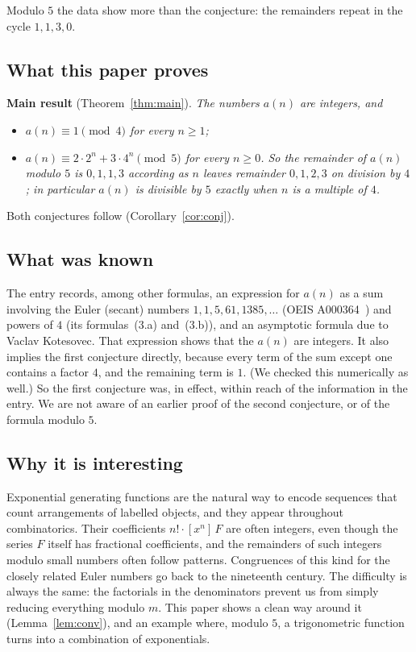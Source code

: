 \documentclass[11pt,a4paper]{article}
\theoremstyle{definition}
\theoremstyle{remark}
\newcommand{\coeff}[2]{[x^{#1}]\,#2}
\begin{document}
Modulo $5$ the data show more than the conjecture: the remainders repeat in the cycle $1,1,3,0$.

\subsection{What this paper proves}
\textbf{Main result} (Theorem~\ref{thm:main}). \emph{The numbers $a(n)$ are integers, and}
\begin{itemize}
\item \emph{$a(n)\equiv1\pmod4$ for every $n\ge1$;}
\item \emph{$a(n)\equiv2\cdot2^n+3\cdot4^n\pmod5$ for every $n\ge0$. So the remainder of $a(n)$ modulo $5$ is $0,1,1,3$
according as $n$ leaves remainder $0,1,2,3$ on division by $4$; in particular $a(n)$ is divisible by $5$ exactly when
$n$ is a multiple of $4$.}
\end{itemize}
Both conjectures follow (Corollary~\ref{cor:conj}).

\subsection{What was known}
The entry records, among other formulas, an expression for $a(n)$ as a sum involving the Euler (secant) numbers
$1,1,5,61,1385,\dots$ (OEIS A000364~\cite{oeissec}) and powers of $4$ (its formulas~(3.a) and~(3.b)), and an asymptotic
formula due to Vaclav Kotesovec. That expression shows that the $a(n)$ are integers. It also implies the first
conjecture directly, because every term of the sum except one contains a factor $4$, and the remaining term is $1$.
(We checked this numerically as well.) So the first conjecture was, in effect, within reach of the information in the
entry. We are not aware of an earlier proof of the second conjecture, or of the formula modulo $5$.

\subsection{Why it is interesting}
Exponential generating functions are the natural way to encode sequences that count arrangements of labelled objects,
and they appear throughout combinatorics. Their coefficients $n!\cdot\coeff{n}{F}$ are often integers, even though the
series $F$ itself has fractional coefficients, and the remainders of such integers modulo small numbers often follow
patterns. Congruences of this kind for the closely related Euler numbers go back to the nineteenth century. The
difficulty is always the same: the factorials in the denominators prevent us from simply reducing everything modulo
$m$. This paper shows a clean way around it (Lemma~\ref{lem:conv}), and an example where, modulo $5$, a trigonometric
function turns into a combination of exponentials.
\end{document}
